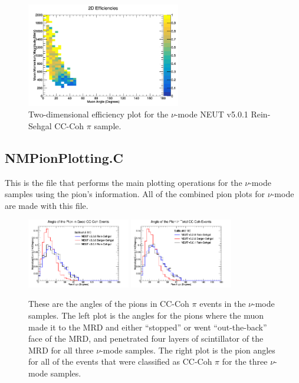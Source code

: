 \documentclass[11pt]{article}
\begin{document}
\begin{figure}[H]
\centering
\includegraphics[width=0.6\textwidth]{CCCohPlots/2DEffNMORS.png}
\caption{Two-dimensional efficiency plot for the $\nu$-mode NEUT v5.0.1 Rein-Sehgal CC-Coh $\pi$ sample.}
\label{fig:app:NMCCCohMuon2DEffORS}
\end{figure}

\subsection{NMPionPlotting.C}
\label{sub:NMPionPlotting.C}
This is the file that performs the main plotting operations for the $\nu$-mode samples using the pion's information. All of the combined pion plots for $\nu$-mode are made with this file.

\begin{figure}[H]
\centering
\includegraphics[width=0.4\textwidth]{NMPionPlottingImages/7-NMPionPlotting.png}
\includegraphics[width=0.4\textwidth]{NMPionPlottingImages/10-NMPionPlotting.png}
\caption{These are the angles of the pions in CC-Coh $\pi$ events in the $\nu$-mode samples. The left plot is the angles for the pions where the muon made it to the MRD and either ``stopped'' or went ``out-the-back'' face of the MRD, and penetrated four layers of scintillator of the MRD for all three $\nu$-mode samples. The right plot is the pion angles for all of the events that were classified as CC-Coh $\pi$ for the three $\nu$-mode samples.}
\label{fig:app:NMPionAng}
\end{figure}
\end{document}
